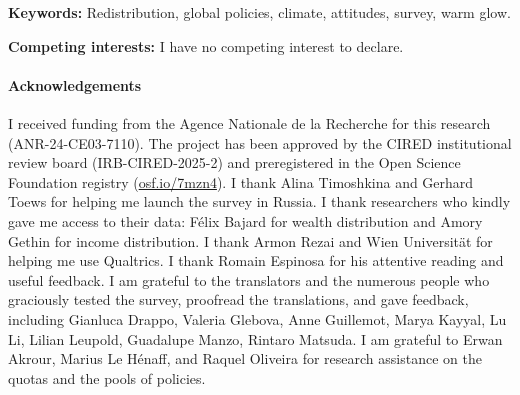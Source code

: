 \documentclass[12pt,english]{article}
\begin{document}
{\small 
\textbf{Keywords:} Redistribution, global policies, climate, %
attitudes, survey, warm glow.%

\textbf{Competing interests:} I have no competing interest to declare.

\paragraph{Acknowledgements} I received funding from the Agence Nationale de la Recherche for this research (ANR-24-CE03-7110). The project has been approved by the CIRED institutional review board (IRB-CIRED-2025-2) and preregistered in the Open Science Foundation registry (\href{https://osf.io/7mzn4}{osf.io/7mzn4}).
I thank Alina Timoshkina and Gerhard Toews for helping me launch the survey in Russia. I thank researchers who kindly gave me access to their data: Félix Bajard for wealth distribution and Amory Gethin for income distribution.
I thank Armon Rezai and Wien Universität for helping me use Qualtrics. 
I thank Romain Espinosa for his attentive reading and useful feedback. I am grateful to the translators and the numerous people who graciously tested the survey, proofread the translations, and gave feedback, including Gianluca Drappo, Valeria Glebova, Anne Guillemot, Marya Kayyal, Lu Li, Lilian Leupold, Guadalupe Manzo, Rintaro Matsuda.
I am grateful to Erwan Akrour, Marius Le Hénaff, and Raquel Oliveira for research assistance on the quotas and the pools of policies. %
}
\clearpage

\onehalfspacing
\end{document}
